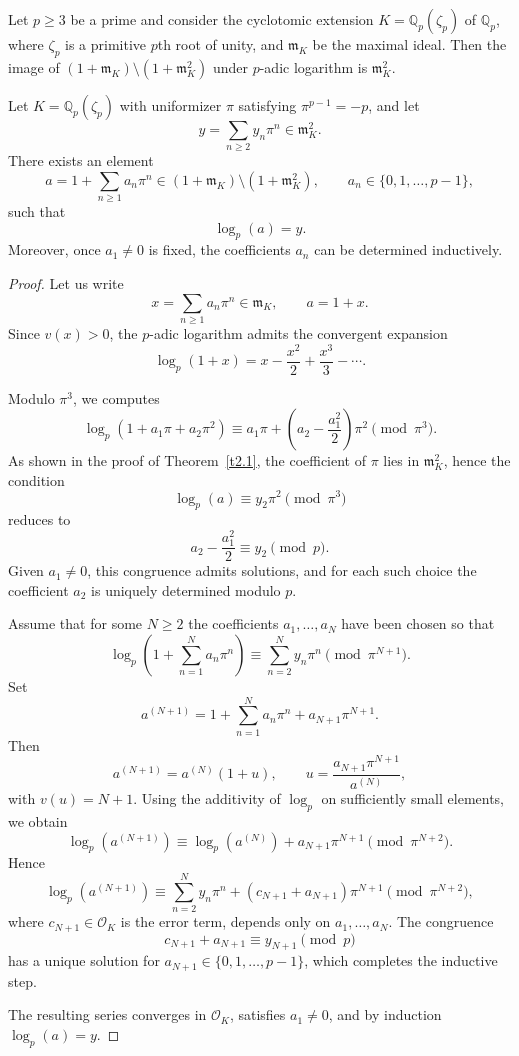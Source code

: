 \documentclass[10pt,a4paper]{amsart}
\begin{document}
\begin{thm}\label{t2.1}
Let $p \geq 3 $ be a prime and consider the cyclotomic extension $K=\mathbb{Q}_p(\zeta_p)$ of $\mathbb{Q}_p$, where $\zeta_p$ is a primitive $p$th root of unity, and $\mathfrak{m}_K$ be the maximal ideal. Then the image of $(1+\mathfrak{m}_K) \setminus (1+\mathfrak{m}_K^2)$ under $p$-adic logarithm is $\mathfrak{m}_K^2$.
\end{thm}

\begin{lem} \label{A1}
Let $K=\mathbb{Q}_p(\zeta_p)$ with uniformizer $\pi$ satisfying $\pi^{p-1}=-p$, and let
\[
y=\sum_{n\ge 2} y_n \pi^n \in \mathfrak m_K^2 .
\]
There exists an element
\[
a=1+\sum_{n\ge 1} a_n \pi^n \in (1+\mathfrak m_K)\setminus(1+\mathfrak m_K^2),
\qquad a_n\in\{0,1,\dots,p-1\},
\]
such that
\[
\log_p(a)=y .
\]
Moreover, once $a_1\neq 0$ is fixed, the coefficients $a_n$ can be determined inductively.
\end{lem}

\begin{proof}
Let us write
\[
x=\sum_{n\ge 1} a_n \pi^n \in \mathfrak m_K ,
\qquad a=1+x .
\]
Since $v(x)>0$, the $p$-adic logarithm admits the convergent expansion
\[
\log_p(1+x)=x-\frac{x^2}{2}+\frac{x^3}{3}-\cdots .
\]


Modulo $\pi^3$, we computes
\[
\log_p(1+a_1\pi+a_2\pi^2)
\equiv a_1\pi+\left(a_2-\frac{a_1^2}{2}\right)\pi^2
\pmod{\pi^3}.
\]
As shown in the proof of Theorem~\ref{t2.1}, the coefficient of $\pi$ lies in
$\mathfrak m_K^2$, hence the condition
\[
\log_p(a)\equiv y_2\pi^2 \pmod{\pi^3}
\]
reduces to
\[
a_2-\frac{a_1^2}{2}\equiv y_2 \pmod{p}.
\]
Given $a_1 \neq 0$, this congruence admits solutions, and for each such choice the
coefficient $a_2$ is uniquely determined modulo $p$.

Assume that for some $N\ge 2$ the coefficients
$a_1,\dots,a_N$ have been chosen so that
\[
\log_p\!\left(1+\sum_{n=1}^N a_n\pi^n\right)
\equiv \sum_{n=2}^N y_n\pi^n
\pmod{\pi^{N+1}}.
\]
Set
\[
a^{(N+1)}=1+\sum_{n=1}^N a_n\pi^n+a_{N+1}\pi^{N+1}.
\]
Then
\[
a^{(N+1)}=a^{(N)}\left(1+u\right),
\qquad
u=\frac{a_{N+1}\pi^{N+1}}{a^{(N)}},
\]
with $v(u)=N+1$. Using the additivity of $\log_p$ on sufficiently small elements,
we obtain
\[
\log_p(a^{(N+1)})
\equiv \log_p(a^{(N)}) + a_{N+1}\pi^{N+1}
\pmod{\pi^{N+2}}.
\]
Hence
\[
\log_p(a^{(N+1)})
\equiv \sum_{n=2}^N y_n\pi^n
+ \left(c_{N+1}+a_{N+1}\right)\pi^{N+1}
\pmod{\pi^{N+2}},
\]
where $c_{N+1}\in\mathcal O_K$ is the error term, depends only on $a_1,\dots,a_N$.
The congruence
\[
c_{N+1}+a_{N+1}\equiv y_{N+1}\pmod{p}
\]
has a unique solution for $a_{N+1}\in\{0,1,\dots,p-1\}$, which completes the
inductive step.


The resulting series converges in $\mathcal O_K$, satisfies $a_1\neq 0$, and by induction $\log_p(a)=y$.
\end{proof}
\end{document}
